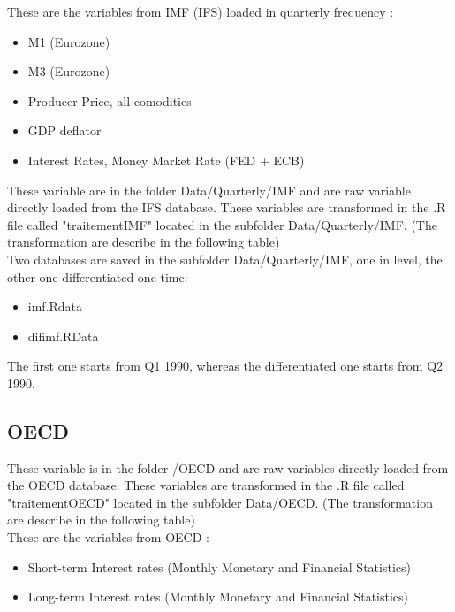 \documentclass[11pt,a4paper]{article}
\begin{document}
\vspace{0.5cm}



These are the variables from IMF (IFS) loaded in quarterly frequency :
\begin{itemize}
\item M1 (Eurozone)
\item M3 (Eurozone)
\item Producer Price, all comodities
\item GDP deflator 
\item Interest Rates, Money Market Rate (FED + ECB)
\end{itemize}

\vspace{0.5cm}

These variable are in the folder Data/Quarterly/IMF and are raw variable directly loaded from the IFS database. These variables are transformed in the .R file called "traitementIMF" located in the subfolder Data/Quarterly/IMF. (The transformation are describe in the following table) \\

Two databases are saved in the subfolder Data/Quarterly/IMF, one in level, the other one differentiated one time: 

\begin{itemize}
\item imf.Rdata 
\item difimf.RData 
\end{itemize}

\vspace{0.5cm}



The first one starts from Q1 1990, whereas the differentiated one starts from Q2 1990.






\subsection{OECD}

These variable is in the folder /OECD and are raw variables directly loaded from the OECD database.  These variables are transformed in the .R file called "traitementOECD" located in the subfolder Data/OECD. (The transformation are describe in the following table) \\


These are the variables from OECD :
\begin{itemize}
\item Short-term Interest rates (Monthly Monetary and Financial Statistics)
\item Long-term Interest rates (Monthly Monetary and Financial Statistics)
\end{itemize}
\end{document}
